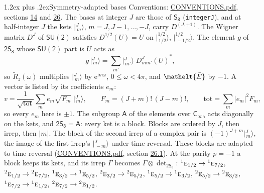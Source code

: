 \documentclass[10pt,a4paper]{article}
\makeatletter
\renewcommand\section{\@startsection{section}{1}{\z@}{-3ex plus -1ex minus -.2ex}%
  {1.2ex plus .2ex}{\normalfont\large\sffamily\bfseries\color{parttitle}}}
\numberwithin{equation}{section}
\newcommand{\eltfont}[1]{{\let\sigma\eltsigma\mathelt{#1}}}
\newcommand{\grp}[1]{\mathsf{#1}}
\newcommand{\irr}[1]{\text{\normalfont\scshape #1}}
\newcommand{\conjpair}[1]{{}^{#1}}
\newcommand{\elt}[1]{\eltfont{#1}}
\newcommand{\iunit}{\mathrm{i}}
\newcommand{\expe}{\mathrm{e}}
\newcommand{\irrJp}[2]{D^{(#1,#2)}}
\newcommand{\wignerD}[1]{D^{#1}}
\newcommand{\conj}[1]{{#1}^{*}}
\newcommand{\irrprod}{\otimes}
\newcommand{\jm}[2]{\bigl\lvert{}^{#1}_{\,#2}\bigr\rangle}
\newcommand{\barred}[1]{\bar{#1}}
\newcommand{\lift}[1]{\tilde{#1}}
\makeatother
\begin{document}
\section{Symmetry-adapted bases}\label{s:bases}
Conventions: \href{../../CONVENTIONS.pdf}{CONVENTIONS.pdf}, sections \href{../../../rotation/CONVENTIONS.pdf\#conv.14}{14} and \href{../../CONVENTIONS.pdf\#conv.26}{26}.
\leavevmode\label{n:index.m}\label{n:vector.ket}The bases at integer $J$ are those of \href{../../../rotation/data/pdf/S8.pdf}{$\grp{S_{8}}$} (\texttt{integerJ}), and at half-integer $J$ the kets $\jm{J}{m}$, $m = J, J-1, \dots, -J$, carry $\irrJp{J}{+1}$. \label{n:matrix.wigner}The Wigner matrix $\wignerD{J}$ of $\grp{SU(2)}$ satisfies $\wignerD{1/2}(U) = U$ on $\jm{1/2}{1/2}$, $\jm{1/2}{-1/2}$. The element $g$ of $\grp{2S_{8}}$ whose $\grp{SU(2)}$ part is $U$ acts as
\begin{equation}\label{e:action}g\,\jm{J}{m} = \sum_{m'} \jm{J}{m'}\; \conj{\wignerD{J}_{m m'}(U)},\end{equation}
so $\lift{R}_{z}(\omega)$ multiplies $\jm{J}{m}$ by $\expe^{\iunit m\omega}$, $0 \le \omega < 4\pi$, and $\elt{\barred{E}}$ by $-1$. \label{n:index.ketcoefficient}\label{n:vector.basis.symmetry}\label{n:index.ketweight}\label{n:index.total}A vector is listed by its coefficients $e_m$:
\begin{equation}\label{e:ket}v = \frac{1}{\sqrt{\mathrm{tot}}}\sum_m e_m\sqrt{F_m}\;\jm{J}{m},\qquad F_m = (J+m)!\,(J-m)!,\qquad \mathrm{tot} = \sum_m |e_m|^2F_m,\end{equation}
so every $e_m$ here is $\pm 1$.
\leavevmode\label{n:group.A}The subgroup $\grp{A}$ of the elements over $\grp{C_{\infty h}}$ acts diagonally on the kets, and $\grp{2S_{8}} = \grp{A}$: every ket is a block. Blocks are ordered by $J$, then irrep, then $|m|$. The block of the second irrep of a complex pair is $(-1)^{J+m}\jm{J}{m}$, the image of the first irrep's $\jm{J}{-m}$ under time reversal. These blocks are adapted to time reversal (\href{../../CONVENTIONS.pdf}{CONVENTIONS.pdf}, section \href{../../CONVENTIONS.pdf\#conv.26.1}{26.1}).
At the parity $p = -1$ a block keeps its kets, and its irrep $\Gamma$ becomes $\Gamma \irrprod \det_{\grp{2S_{8}}}$: $\conjpair{1}\irr{e}_{1/2} \to \conjpair{1}\irr{e}_{7/2}$, $\conjpair{2}\irr{e}_{1/2} \to \conjpair{2}\irr{e}_{7/2}$, $\conjpair{1}\irr{e}_{3/2} \to \conjpair{1}\irr{e}_{5/2}$, $\conjpair{2}\irr{e}_{3/2} \to \conjpair{2}\irr{e}_{5/2}$, $\conjpair{1}\irr{e}_{5/2} \to \conjpair{1}\irr{e}_{3/2}$, $\conjpair{2}\irr{e}_{5/2} \to \conjpair{2}\irr{e}_{3/2}$, $\conjpair{1}\irr{e}_{7/2} \to \conjpair{1}\irr{e}_{1/2}$, $\conjpair{2}\irr{e}_{7/2} \to \conjpair{2}\irr{e}_{1/2}$.
\end{document}
